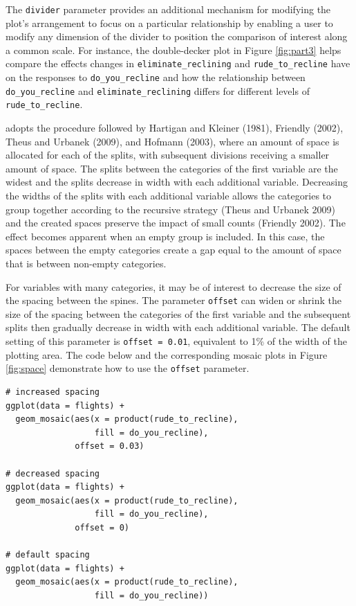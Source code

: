 The \texttt{divider} parameter provides an additional mechanism for modifying the plot's arrangement to focus on a particular relationship by enabling a user to modify any dimension of the divider to position the comparison of interest along a common scale. For instance, the double-decker plot in Figure \ref{fig:part3} helps compare the effects changes in \texttt{eliminate\_reclining} and \texttt{rude\_to\_recline} have on the responses to \texttt{do\_you\_recline} and how the relationship between \texttt{do\_you\_recline} and \texttt{eliminate\_reclining} differs for different levels of \texttt{rude\_to\_recline}.

 adopts the procedure followed by Hartigan and Kleiner (1981), Friendly (2002), Theus and Urbanek (2009), and Hofmann (2003), where an amount of space is allocated for each of the splits, with subsequent divisions receiving a smaller amount of space. The splits between the categories of the first variable are the widest and the splits decrease in width with each additional variable. Decreasing the widths of the splits with each additional variable allows the categories to group together according to the recursive strategy (Theus and Urbanek 2009) and the created spaces preserve the impact of small counts (Friendly 2002). The effect becomes apparent when an empty group is included. In this case, the spaces between the empty categories create a gap equal to the amount of space that is between non-empty categories.

For variables with many categories, it may be of interest to decrease the size of the spacing between the spines. The parameter \texttt{offset} can widen or shrink the size of the spacing between the categories of the first variable and the subsequent splits then gradually decrease in width with each additional variable. The default setting of this parameter is \texttt{offset\ =\ 0.01}, equivalent to 1\% of the width of the plotting area. The code below and the corresponding mosaic plots in Figure \ref{fig:space} demonstrate how to use the \texttt{offset} parameter.

\begin{verbatim}
# increased spacing
ggplot(data = flights) +
  geom_mosaic(aes(x = product(rude_to_recline), 
                  fill = do_you_recline),
              offset = 0.03) 
  
# decreased spacing
ggplot(data = flights) +
  geom_mosaic(aes(x = product(rude_to_recline), 
                  fill = do_you_recline),
              offset = 0) 

# default spacing
ggplot(data = flights) +
  geom_mosaic(aes(x = product(rude_to_recline), 
                  fill = do_you_recline)) 
\end{verbatim}

